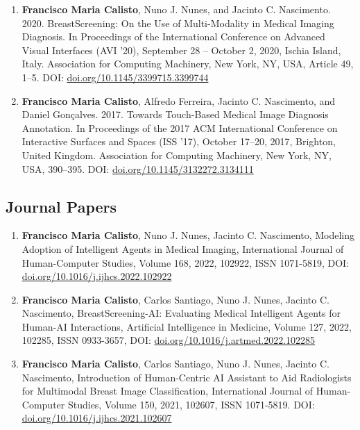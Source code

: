 \begin{enumerate}
\item {\bf Francisco Maria Calisto}, Nuno J. Nunes, and Jacinto C. Nascimento. 2020. BreastScreening: On the Use of Multi-Modality in Medical Imaging Diagnosis. In Proceedings of the International Conference on Advanced Visual Interfaces (AVI '20), September 28 -- October 2, 2020, Ischia Island, Italy. Association for Computing Machinery, New York, NY, USA, Article 49, 1–5. DOI: \href{https://doi.org/10.1145/3399715.3399744}{doi.org/10.1145/3399715.3399744}
\item {\bf Francisco Maria Calisto}, Alfredo Ferreira, Jacinto C. Nascimento, and Daniel Gon\c{c}alves. 2017. Towards Touch-Based Medical Image Diagnosis Annotation. In Proceedings of the 2017 ACM International Conference on Interactive Surfaces and Spaces (ISS '17), October 17--20, 2017, Brighton, United Kingdom. Association for Computing Machinery, New York, NY, USA, 390–395. DOI: \href{https://doi.org/10.1145/3132272.3134111}{doi.org/10.1145/3132272.3134111}
\end{enumerate}

\subsection{Journal Papers}
\label{sec:chap00100602}

\begin{enumerate}
\item {\bf Francisco Maria Calisto}, Nuno J. Nunes, Jacinto C. Nascimento, Modeling Adoption of Intelligent Agents in Medical Imaging, International Journal of Human-Computer Studies, Volume 168, 2022, 102922, ISSN 1071-5819, DOI: \href{https://doi.org/10.1016/j.ijhcs.2022.102922}{doi.org/10.1016/j.ijhcs.2022.102922}
\item {\bf Francisco Maria Calisto}, Carlos Santiago, Nuno J. Nunes, Jacinto C. Nascimento, BreastScreening-AI: Evaluating Medical Intelligent Agents for Human-AI Interactions, Artificial Intelligence in Medicine, Volume 127, 2022, 102285, ISSN 0933-3657, DOI: \href{https://doi.org/10.1016/j.artmed.2022.102285}{doi.org/10.1016/j.artmed.2022.102285}
\item {\bf Francisco Maria Calisto}, Carlos Santiago, Nuno J. Nunes, Jacinto C. Nascimento, Introduction of Human-Centric AI Assistant to Aid Radiologists for Multimodal Breast Image Classification, International Journal of Human-Computer Studies, Volume 150, 2021, 102607, ISSN 1071-5819. DOI: \href{https://doi.org/10.1016/j.ijhcs.2021.102607}{doi.org/10.1016/j.ijhcs.2021.102607}
\end{enumerate}

